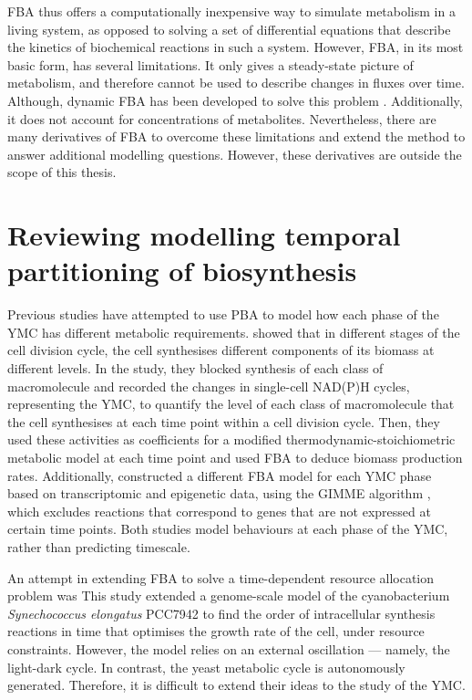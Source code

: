 FBA thus offers a computationally inexpensive way to simulate metabolism in a living system, as opposed to solving a set of differential equations that describe the kinetics of biochemical reactions in such a system.
However, FBA, in its most basic form, has several limitations.
It only gives a steady-state picture of metabolism, and therefore cannot be used to describe changes in fluxes over time.
Although, dynamic FBA has been developed to solve this problem \parencite{mahadevanDynamicFluxBalance2002}.
Additionally, it does not account for concentrations of metabolites.
Nevertheless, there are many derivatives of FBA to overcome these limitations and extend the method to answer additional modelling questions.
However, these derivatives are outside the scope of this thesis.


\section{Reviewing modelling temporal partitioning of biosynthesis}
\label{sec:model-temporal}

Previous studies have attempted to use PBA to model how each phase of the YMC has different metabolic requirements.
\textcite{takhaveevTemporalSegregationBiosynthetic2023} showed that in different stages of the cell division cycle, the cell synthesises different components of its biomass at different levels.
In the study, they blocked synthesis of each class of macromolecule and recorded the changes in single-cell NAD(P)H cycles, representing the YMC, to quantify the level of each class of macromolecule that the cell synthesises at each time point within a cell division cycle.
Then, they used these activities as coefficients for a modified thermodynamic-stoichiometric metabolic model at each time point and used FBA to deduce biomass production rates.
Additionally, \textcite{cesurGenomeWideAnalysisYeast} constructed a different FBA model for each YMC phase based on transcriptomic and epigenetic data, using the GIMME algorithm \parencite{beckerContextSpecificMetabolicNetworks2008}, which excludes reactions that correspond to genes that are not expressed at certain time points.
Both studies model behaviours at each phase of the YMC, rather than predicting timescale.

An attempt in extending FBA to solve a time-dependent resource allocation problem was \textcite{reimersCellularTradeoffsOptimal2017}
This study extended a genome-scale model of the cyanobacterium \textit{Synechococcus elongatus} PCC7942 to find the order of intracellular synthesis reactions in time that optimises the growth rate of the cell, under resource constraints.
However, the model relies on an external oscillation --- namely, the light-dark cycle.
In contrast, the yeast metabolic cycle is autonomously generated.
Therefore, it is difficult to extend their ideas to the study of the YMC.

